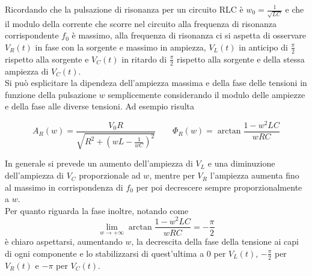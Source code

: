 \documentclass{article}
\begin{document}
Ricordando che la pulsazione di risonanza per un circuito RLC è $w_0=\frac{1}{\sqrt{LC}}$ e che il modulo della corrente che scorre nel circuito alla frequenza di risonanza corrispondente $f_0$ è massimo, alla frequenza di risonanza ci si aspetta di 
osservare $V_R(t)$ in fase con la sorgente e massimo in ampiezza, $V_L(t)$ in anticipo di $\frac{\pi}{2}$ rispetto alla sorgente e $V_C(t)$ in ritardo di $\frac{\pi}{2}$ rispetto alla sorgente e della stessa ampiezza di  $V_C(t)$. \\
Si può esplicitare la dipendeza dell'ampiezza massima e della fase delle tensioni in funzione della pulsazione $w$ semplicemente considerando il modulo delle ampiezze e della fase alle diverse tensioni. Ad esempio risulta

\begin{equation}
 A_R(w) =\frac{V_{0}R}{\sqrt{R^2+(wL-\frac{1}{wC})^2}} \qquad \Phi_R(w)=\arctan{\frac{1-w^2LC}{wRC}}
\end{equation}






In generale si prevede
un aumento dell'ampiezza di $V_L$ e una diminuzione dell'ampiezza di $V_C$ proporzionale ad $w$, mentre per $V_R$ l'ampiezza aumenta fino al massimo in corrispondenza di $f_0$ per poi decrescere sempre proporzionalmente a $w$. \\Per quanto riguarda la fase inoltre, notando come 
\begin{equation}
  \lim_{w \to + \infty}\arctan{\frac{1-w^2LC}{wRC}} = -\frac{\pi}{2}
\end{equation}
è chiaro aspettarsi, aumentando $w$, la decrescita della fase della tensione ai capi di ogni componente e lo stabilizzarsi di quest'ultima a 0 per $V_L(t)$, $-\frac{\pi}{2}$ per $V_R(t)$ e $-\pi$ per $V_C(t)$.
\end{document}
